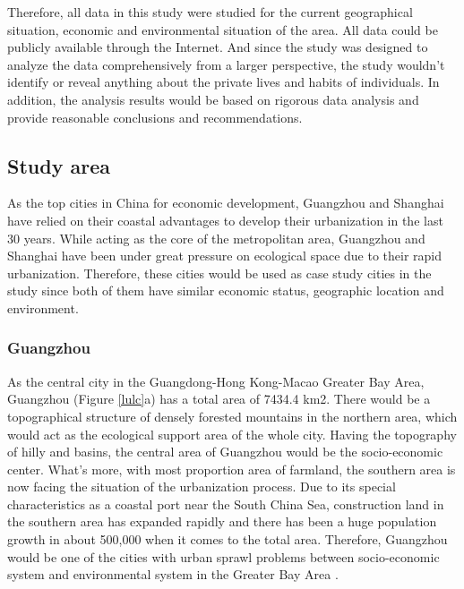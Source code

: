 Therefore, all data in this study were studied for the current geographical situation, economic and environmental situation of the area. All data could be publicly available through the Internet. And since the study was designed to analyze the data comprehensively from a larger perspective, the study wouldn't identify or reveal anything about the private lives and habits of individuals. In addition, the analysis results would be based on rigorous data analysis and provide reasonable conclusions and recommendations.\\


\subsection{Study area}

As the top cities in China for economic development, Guangzhou and Shanghai have relied on their coastal advantages to develop their urbanization in the last 30 years. While acting as the core of the metropolitan area, Guangzhou and Shanghai have been under great pressure on ecological space due to their rapid urbanization. Therefore, these cities would be used as case study cities in the study since both of them have similar economic status, geographic location and environment.\\

\subsubsection{Guangzhou}
As the central city in the Guangdong-Hong Kong-Macao Greater Bay Area, Guangzhou (Figure \ref{lulc}a) has a total area of 7434.4 km2. There would be a topographical structure of densely forested mountains in the northern area, which would act as the ecological support area of the whole city. Having the topography of hilly and basins, the central area of Guangzhou would be the socio-economic center. What’s more, with most proportion area of farmland, the southern area is now facing the situation of the urbanization process. Due to its special characteristics as a coastal port near the South China Sea, construction land in the southern area has expanded rapidly and there has been a huge population growth in about 500,000 when it comes to the total area. Therefore, Guangzhou would be one of the cities with urban sprawl problems between socio-economic system and environmental system in the Greater Bay Area \parencite{li_research_2021}.\\

